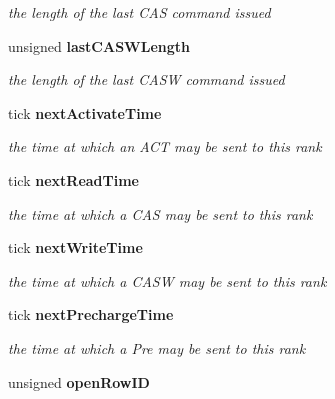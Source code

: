 \begin{DoxyCompactItemize}
\begin{DoxyCompactList}\small\item\em the length of the last CAS command issued \item\end{DoxyCompactList}\item 
unsigned {\bf lastCASWLength}\label{class_d_r_a_msim_i_i_1_1_bank_a13671b3b1796ca5b2caa0962173917bd}

\begin{DoxyCompactList}\small\item\em the length of the last CASW command issued \item\end{DoxyCompactList}\item 
tick {\bf nextActivateTime}\label{class_d_r_a_msim_i_i_1_1_bank_a6a48df6911a12cb377e96ce17ffb4812}

\begin{DoxyCompactList}\small\item\em the time at which an ACT may be sent to this rank \item\end{DoxyCompactList}\item 
tick {\bf nextReadTime}\label{class_d_r_a_msim_i_i_1_1_bank_a1a3853a15aeb5acdebb08276cd3ab058}

\begin{DoxyCompactList}\small\item\em the time at which a CAS may be sent to this rank \item\end{DoxyCompactList}\item 
tick {\bf nextWriteTime}\label{class_d_r_a_msim_i_i_1_1_bank_aa9457ae760afdb834c9b68ee769ade5f}

\begin{DoxyCompactList}\small\item\em the time at which a CASW may be sent to this rank \item\end{DoxyCompactList}\item 
tick {\bf nextPrechargeTime}\label{class_d_r_a_msim_i_i_1_1_bank_a5ce499e4b27efbcc9eb49e135651c971}

\begin{DoxyCompactList}\small\item\em the time at which a Pre may be sent to this rank \item\end{DoxyCompactList}\item 
unsigned {\bf openRowID}\label{class_d_r_a_msim_i_i_1_1_bank_a40240127116ab430e809ed300949511e}


\end{DoxyCompactItemize}
